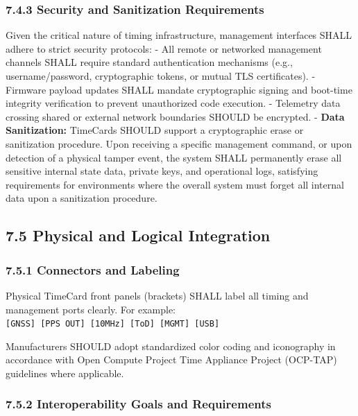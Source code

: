 \subsubsection{7.4.3 Security and Sanitization
Requirements}\label{security-and-sanitization-requirements}

Given the critical nature of timing infrastructure, management
interfaces SHALL adhere to strict security protocols: - All remote or
networked management channels SHALL require standard authentication
mechanisms (e.g., username/password, cryptographic tokens, or mutual TLS
certificates). - Firmware payload updates SHALL mandate cryptographic
signing and boot-time integrity verification to prevent unauthorized
code execution. - Telemetry data crossing shared or external network
boundaries SHOULD be encrypted. - \textbf{Data Sanitization:} TimeCards
SHOULD support a cryptographic erase or sanitization procedure. Upon
receiving a specific management command, or upon detection of a physical
tamper event, the system SHALL permanently erase all sensitive internal
state data, private keys, and operational logs, satisfying requirements
for environments where the overall system must forget all internal data
upon a sanitization procedure.

\subsection{7.5 Physical and Logical
Integration}\label{physical-and-logical-integration}

\subsubsection{7.5.1 Connectors and
Labeling}\label{connectors-and-labeling}

Physical TimeCard front panels (brackets) SHALL label all timing and
management ports clearly. For example:
\texttt{{[}GNSS{]}\ {[}PPS\ OUT{]}\ {[}10MHz{]}\ {[}ToD{]}\ {[}MGMT{]}\ {[}USB{]}}

Manufacturers SHOULD adopt standardized color coding and iconography in
accordance with Open Compute Project Time Appliance Project (OCP-TAP)
guidelines where applicable.

\subsubsection{7.5.2 Interoperability Goals and
Requirements}\label{interoperability-goals-and-requirements}

